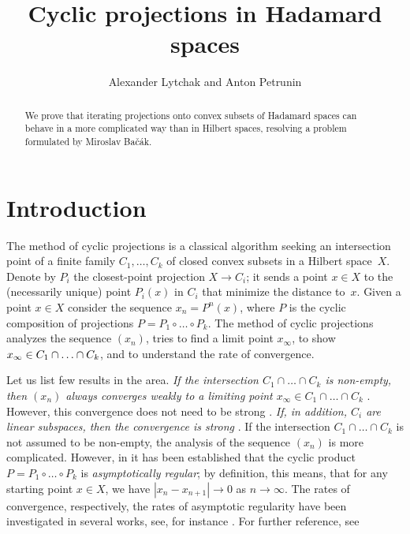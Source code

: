 \documentclass[a4paper,10pt]{article}
\def\thetitle{Cyclic projections in Hadamard spaces}
\def\theauthors{Alexander Lytchak and Anton Petrunin}
\begin{document}


\title{\thetitle}	
\author{\theauthors}
\date{}
\maketitle

\begin{abstract}
We  prove that iterating projections onto convex subsets of Hadamard spaces can behave in a more complicated way than in Hilbert spaces, resolving a problem formulated by Miroslav Bačák.
\end{abstract}


\section{Introduction}

The method of cyclic  projections is a classical algorithm seeking  an intersection point of a finite family  $C_1,\dots, C_k$ of  closed convex subsets in a Hilbert  space~$X$.
Denote by $P_i$ the closest-point projection $X\to C_i$; it sends a point $x\in X$ to the (necessarily unique) point $P_i(x)$ in $C_i$ that minimize the distance to~$x$.
Given a point $x\in X$ consider the sequence $x_n=P^n(x)$, where
$P$ is the  cyclic composition of projections $P= P_1\circ \dots \circ P_k$.  The method of cyclic projections analyzes the sequence $(x_n)$, tries to find a limit point $x_{\infty}$, to show $x_{\infty} \in C_1\cap\z\dots\cap C_k$, and to understand the  rate of convergence.

Let us list few results in the area.
\emph{If the intersection  $C_1\cap \dots\cap C_k$ is non-empty, then $(x_n)$ always converges weakly to a limiting point $x_{\infty} \in  C_1\cap \dots\cap C_k$} \cite{bregman}.
However, this convergence does not need to be strong \cite{hundal}.
\emph{If, in addition,  $C_i$ are  linear subspaces, then the convergence is strong} \cite{vonneumann,halperin}.
If the intersection  $C_1\cap \dots\cap C_k$ is not assumed to be non-empty,  the analysis of the sequence $(x_n)$ is more complicated.
However, in \cite{bauschke} it has been established that the cyclic product $P= P_1\circ \dots \circ P_k$ is \emph{asymptotically regular};
by definition, this means, that for any starting point  $x\in X$, we have  $|x_n-x_{n+1}|\to 0$ as $n\to \infty$.
The rates of convergence, respectively, the rates of asymptotic regularity have been investigated in several works, see, for instance \cite{bauschke-borwein-lewis, Kohlenbach}.
For further reference, see \cite{bauschke-borwein-lewis, deutsch, Bac, Bac2}
\end{document}
